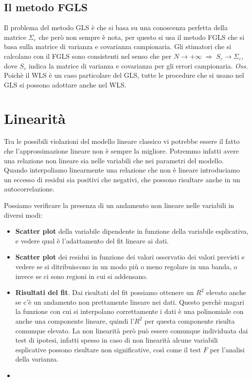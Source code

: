 \subsection{Il metodo FGLS}
Il problema del metodo GLS è che si basa su una conoscenza perfetta della matrice $\Sigma_\varepsilon$ che però non sempre è nota, per questo si usa il metodo FGLS che si basa sulla matrice di varianza e covarianza campionaria. Gli stimatori che si calcolano con il FGLS sono consistenti nel senso che per $N \rightarrow +\infty \; \Rightarrow \; S_\varepsilon \rightarrow \Sigma_\varepsilon$, dove $S_\varepsilon$ indica la matrice di varianza e covarianza per gli errori campionaria.
\textit{Oss.}\\
Poichè il WLS è un caso particolare del GLS, tutte le procedure che si usano nel GLS si possono adottare anche nel WLS. 

\section{Linearità}
Tra le possibili violazioni del modello lineare classico vi potrebbe essere il fatto che l'approssimazione lineare non è sempre la migliore. Potremmo infatti avere una relazione non lineare sia nelle variabili che nei parametri del modello. Quando interpoliamo linearmente una relazione che non è lineare introduciamo un eccesso di residui sia positivi che negativi, che possono risultare anche in un autocorrelazione.

Possiamo verificare la presenza di un andamento non lineare nelle variabili in diversi modi:
\begin{itemize}
	\item \textbf{Scatter plot} della variabile dipendente in funzione della variabile esplicativa, e vedere qual è l'adattamento del fit lineare ai dati.
	\item \textbf{Scatter plot} dei residui in funzione dei valori osservatio dei valori previsti e vedere se si ditribuiscono in un modo più o meno regolare in una banda, o invece se ci sono regioni in cui si addensano.
	\item \textbf{Risultati del fit}. Dai risultati del fit possiamo ottenere un $R^2$ elevato anche se c'è un andamento non prettamente lineare nei dati. Questo perchè magari la funzione con cui si interpolano correttamente i dati è una polinomiale con anche una componente lineare, quindi l'$R^2$ per questa componente risulta comunque elevato. La non linearità però può essere comunque individuata dai test di ipotesi, infatti spesso in caso di non linearità alcune variabili esplicative possono risultare non significative, così come il test $F$ per l'analisi della varianza.
	\item 
\end{itemize}

